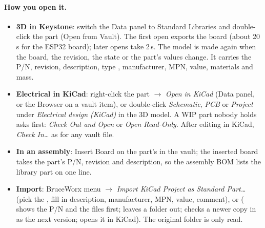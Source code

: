 \paragraph{How you open it.}
\begin{itemize}[nosep]
  \item \textbf{3D in Keystone}: switch the Data panel to Standard Libraries and double-click the part (Open from
        Vault). The first open exports the board (about 20\,s for the ESP32 board); later opens take 2\,s. The model
        is made again when the board, the revision, the state or the part's values change. It carries the P/N,
        revision, description, type , manufacturer, MPN, value, materials and mass.
  \item \textbf{Electrical in KiCad}: right-click the part $\rightarrow$ \emph{Open in KiCad} (Data panel, or the
        Browser on a vault item), or double-click \emph{Schematic}, \emph{PCB} or \emph{Project} under
        \emph{Electrical design (KiCad)} in the 3D model. A WIP part nobody holds asks first: \emph{Check Out and
        Open} or \emph{Open Read-Only}. After editing in KiCad, \emph{Check In\ldots} as for any vault file.
  \item \textbf{In an assembly}: Insert Board on the part's  in the vault; the inserted board takes
        the part's P/N, revision and description, so the assembly BOM lists the library part on one line.
  \item \textbf{Import}: BruceWorx menu $\rightarrow$ \emph{Import KiCad Project as Standard Part\ldots} (pick the
        , fill in description, manufacturer, MPN, value, comment), or
        ( shows the P/N and the files first;  leaves a folder out;
         checks a newer copy in as the next version;  opens it in KiCad). The
        original folder is only read.
\end{itemize}

